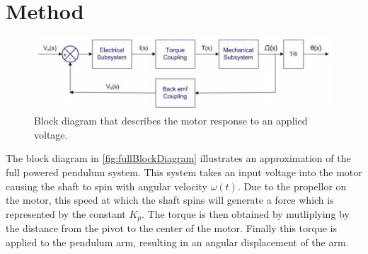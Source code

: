 \documentclass[a4paper, 12pt, compsoc]{IEEEtran}
\begin{document}
    \section{Method}\label{sec:methods}
        \begin{figure}[!h]
            \centering
            \includegraphics[width=\columnwidth]{motorTF.png}
            \caption{Block diagram that describes the motor response to an applied voltage. \cite{gouws_2008}}
            \label{fig:motorBlockDiagram}
        \end{figure}
        
        The block diagram in \cref{fig:fullBlockDiagram} illustrates an approximation of the full powered pendulum system. This system takes an input voltage into the motor causing the shaft to spin with angular velocity $\omega(t)$. Due to the propellor on the motor, this speed at which the shaft spins will generate a force which is represented by the constant $K_p$. The torque is then obtained by mutliplying by the distance from the pivot to the center of the motor. Finally this torque is applied to the pendulum arm, resulting in an angular displacement of the arm.
        \par
\end{document}
